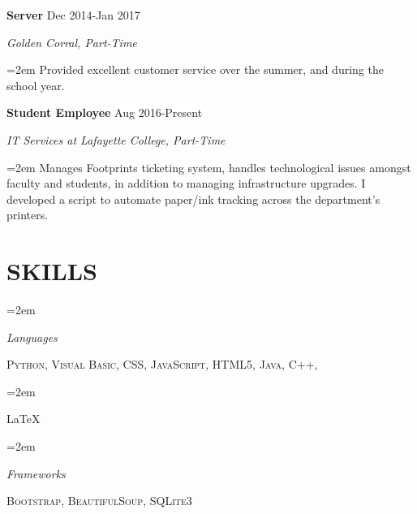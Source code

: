 \documentclass[paper=letter,fontsize=11pt]{scrartcl} %
\newlength{\spacebox}
\newcommand{\sepspace}{\vspace*{1em}}		%
\newcommand{\NewPart}[1]{\section*{\uppercase{#1}}}
\newcommand{\PersonalEntry}[2]{
		\noindent\hangindent=2em\hangafter=0 %
		\parbox{\spacebox}{        %
		\textit{#1}}		       %
		\hspace{1.5em} #2 \par}    %
\newcommand{\SkillsEntry}[2]{      %
		\noindent\hangindent=2em\hangafter=0 %
		\parbox{\spacebox}{        %
		\textit{#1}}			   %
		\hspace{1.5em} #2 \par}    %
\newcommand{\EducationEntry}[4]{
		\noindent \textbf{#1} \hfill      %
		\colorbox{White}{%
			\parbox{6em}{%
			\hfill\color{Black}#2}} \par  %
		\noindent \textit{#3} \par        %
		\noindent\hangindent=2em\hangafter=0 \small #4 %
		\normalsize \par}
\newcommand{\WorkEntry}[4]{				  %
		\noindent \textbf{#1} \hfill      %
		\colorbox{White}{\color{Black}#2} \par  %
		\noindent \textit{#3} \par              %
		\noindent\hangindent=2em\hangafter=0 \small #4 %
		\normalsize \par}
\begin{document}
\WorkEntry{Server}{Dec 2014-Jan 2017}{Golden Corral, Part-Time}{Provided excellent customer service over the summer, and during the school year.}
\sepspace

\WorkEntry{Student Employee}{Aug 2016-Present}{IT Services at Lafayette College, Part-Time}{Manages Footprints ticketing system, handles technological issues amongst faculty and students, in addition to managing infrastructure upgrades. I developed a script to automate paper/ink tracking across the department's printers.}

\NewPart{Skills}{}

\SkillsEntry{Languages}{\textsc{Python}, \textsc{Visual Basic}, \textsc{CSS}, \textsc{JavaScript}, \textsc{HTML5}, \textsc{Java}, \textsc{C++},}
\SkillsEntry{ }{\LaTeX}
\SkillsEntry{Frameworks}{\textsc{Bootstrap}, \textsc{BeautifulSoup}, \textsc{SQLite3}}


\end{document}
